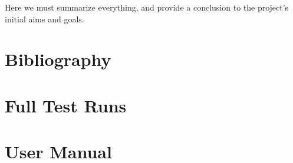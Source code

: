 \documentclass[11pt,a4paper]{article}
\begin{document}
Here we must summarize everything, and provide a conclusion to the project's
initial aims and goals.

\section{Bibliography}
\printbibliography

\appendix

\section{Full Test Runs}
\label{s:full-test-runs}


\section{User Manual}
\label{s:user-manual}

\end{document}
